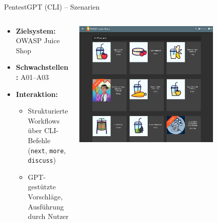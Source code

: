 \documentclass[
	aspectratio=169,	%
	onlytextwidth,		%
	t,					%
	]{beamer}
\begin{document}
\begin{frame}{PentestGPT (CLI) – Szenarien}
	\begin{columns}
		\begin{column}[T]{.4\textwidth}
			\begin{itemize}
				\item \textbf{Zielsystem:}  
				OWASP Juice Shop 
				
				\item \textbf{Schwachstellen:}  
				A01–A03 
				
				\item \textbf{Interaktion:}
				\begin{itemize}
					\item Strukturierte Workflows über CLI-Befehle \\
					(\texttt{next}, \texttt{more}, \texttt{discuss})\\
					\item GPT-gestützte Vorschläge, Ausführung durch Nutzer
				\end{itemize}
			\end{itemize}
		\end{column}
		\begin{column}[T]{.6\textwidth}
			\centering
			\vspace{-4mm}
			\includegraphics[width=0.75\textwidth]{figures/23.png}
			\label{fig:23}
		\end{column}
	\end{columns}
\end{frame}
\end{document}
